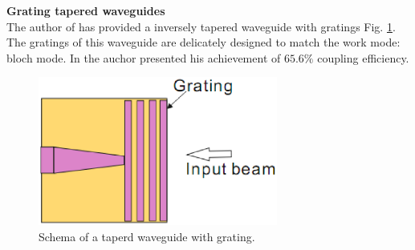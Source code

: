 \textbf{Grating tapered waveguides}\\
The author of \cite{fiber_to_chip_grating_waveguides} has provided a inversely tapered waveguide with gratings Fig. \ref{fig:tapered_waveguide_grating}. The gratings of this waveguide are  delicately designed to match the work mode: bloch mode. In \cite{fiber_to_chip_grating_waveguides} the auchor presented his achievement of $65.6\%$ coupling efficiency.  
\begin{figure}[!ht]
\centering
\includegraphics[width=0.7\textwidth]{bilder/tapered_waveguide_grating}
\caption{Schema of a taperd waveguide with grating.}
\label{fig:tapered_waveguide_grating}
\end{figure}
